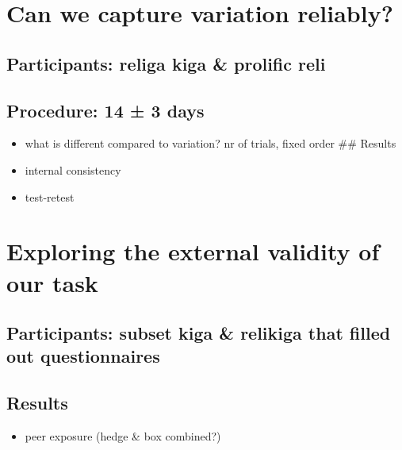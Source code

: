 \documentclass[
  english,
  man,floatsintext]{apa6}
\providecommand{\tightlist}{%
  \setlength{\itemsep}{0pt}\setlength{\parskip}{0pt}}
\begin{document}
\hypertarget{can-we-capture-variation-reliably}{%
\section{Can we capture variation reliably?}\label{can-we-capture-variation-reliably}}

\hypertarget{participants-religa-kiga-prolific-reli}{%
\subsection{Participants: religa kiga \& prolific reli}\label{participants-religa-kiga-prolific-reli}}

\hypertarget{procedure-14-3-days}{%
\subsection{Procedure: 14 ± 3 days}\label{procedure-14-3-days}}

\begin{itemize}
\tightlist
\item
  what is different compared to variation? nr of trials, fixed order
  \#\# Results
\item
  internal consistency
\item
  test-retest
\end{itemize}

\hypertarget{exploring-the-external-validity-of-our-task}{%
\section{Exploring the external validity of our task}\label{exploring-the-external-validity-of-our-task}}

\hypertarget{participants-subset-kiga-relikiga-that-filled-out-questionnaires}{%
\subsection{Participants: subset kiga \& relikiga that filled out questionnaires}\label{participants-subset-kiga-relikiga-that-filled-out-questionnaires}}

\hypertarget{results-4}{%
\subsection{Results}\label{results-4}}

\begin{itemize}
\tightlist
\item
  peer exposure (hedge \& box combined?)
\end{itemize}
\end{document}
